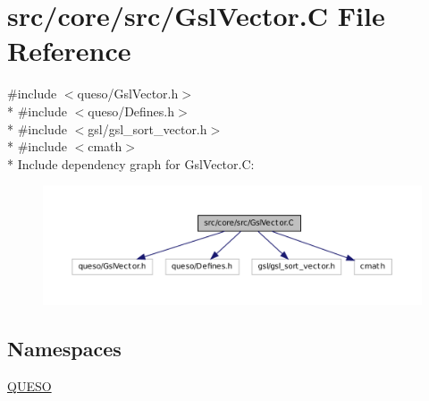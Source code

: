 \hypertarget{_gsl_vector_8_c}{\section{src/core/src/\-Gsl\-Vector.C File Reference}
\label{_gsl_vector_8_c}
}
{\ttfamily \#include $<$queso/\-Gsl\-Vector.\-h$>$}\\*
{\ttfamily \#include $<$queso/\-Defines.\-h$>$}\\*
{\ttfamily \#include $<$gsl/gsl\-\_\-sort\-\_\-vector.\-h$>$}\\*
{\ttfamily \#include $<$cmath$>$}\\*
Include dependency graph for Gsl\-Vector.\-C\-:
\nopagebreak
\begin{figure}[H]
\begin{center}
\leavevmode
\includegraphics[width=350pt]{_gsl_vector_8_c__incl}
\end{center}
\end{figure}
\subsection*{Namespaces}
\begin{DoxyCompactItemize}
\item 
\hyperlink{namespace_q_u_e_s_o}{Q\-U\-E\-S\-O}
\end{DoxyCompactItemize}
